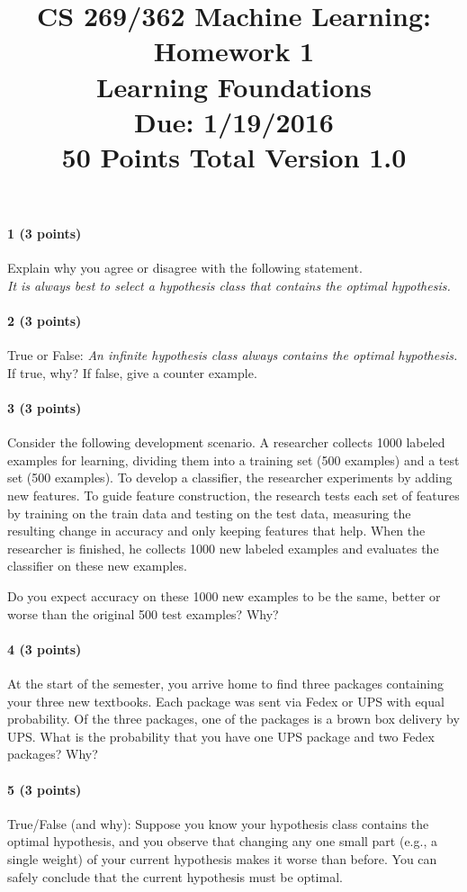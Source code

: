 \documentclass[11pt]{article}
\title{CS 269/362 Machine Learning: Homework 1\\Learning Foundations\\
\Large{Due: 1/19/2016}\\
50 Points Total \hspace{1cm} Version 1.0}
\author{}
\date{}
\begin{document}
\large
\maketitle
\thispagestyle{headings}

\vspace{-.5in}

\paragraph{1 (3 points)} Explain why you agree or disagree with the following statement.\\
{\it It is always best to select a hypothesis class that contains the optimal hypothesis.}

\paragraph{2 (3 points)} True or False: {\it An infinite hypothesis class always contains the optimal hypothesis.} If true, why? If false, give a counter example.

\paragraph{3 (3 points)} Consider the following development scenario. A researcher collects 1000 labeled examples for learning, dividing them into a training set (500 examples) and a test set (500 examples). To develop a classifier, the researcher experiments by adding new features. To guide feature construction, the research tests each set of features by training on the train data and testing on the test data, measuring the resulting change in accuracy and only keeping features that help. When the researcher is finished, he collects 1000 new labeled examples and evaluates the classifier on these new examples.

Do you expect accuracy on these 1000 new examples to be the same, better or worse than the original 500 test examples? Why?

\paragraph{4 (3 points)} At the start of the semester, you arrive home to find three packages containing your three new textbooks. Each package was sent via Fedex or UPS with equal probability. Of the three packages, one of the packages is a brown box delivery by UPS. What is 
the probability that you have one UPS package and two Fedex packages? Why?

\paragraph{5 (3 points)} 
True/False (and why): Suppose you know your hypothesis class contains the optimal hypothesis, and you observe that changing any one small part (e.g., a single weight) of your current hypothesis makes it worse than before. You can safely conclude that the current hypothesis must be optimal.
\end{document}
